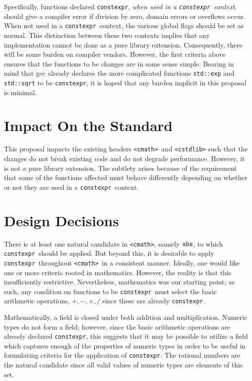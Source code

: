 \documentclass[prd,preprint,amsmath,amssymb,nofootinbib,eqsecnum]{revtex4-1}
\newcommand{\code}[1]{{\tt #1}}
\newcommand{\constexpr}{\code{constexpr}}
\newcommand{\header}[1]{{\tt <#1>}}
\newcommand{\cmath}{\header{cmath}}
\begin{document}
Specifically, functions declared \constexpr, \emph{when used in a \constexpr\ context}, should give a compiler error if division by zero, domain errors or overflows occur. When not used in a \constexpr\ context, the various global flags should be set as normal. This distinction between these two contexts implies that any implementation cannot be done as a pure library extension. Consequently, there will be some burden on compiler vendors. However, the first criteria above ensures that the functions to be changes are in some sense simple. Bearing in mind that gcc already declares the more complicated functions \code{std::exp} and \code{std::sqrt} to be \constexpr, it is hoped that any burden implicit in this proposal is minimal.

\section{Impact On the Standard}

This proposal impacts the existing headers \cmath\ and \header{cstdlib} such that the changes do not break existing code and do not degrade performance. However, it is not a pure library extension. The subtlety arises because of the requirement that some of the functions affected must behave differently depending on whether or not they are used in a \constexpr\ context.

\section{Design Decisions}

There is at least one natural candidate in \header{cmath}, namely $\code{abs}$, to which \constexpr\ should be applied. But beyond this, it is desirable to apply \constexpr\ throughout \cmath\ in a consistent manner. Ideally, one would like one or more criteria rooted in mathematics. However, the reality is that this insufficiently restrictive. Nevertheless, mathematics was our starting point; as such, any condition on functions to be \constexpr\ must select the basic arithmetic operations, $+,-,\times,/$ since these are already \constexpr.

Mathematically, a field is closed under both addition and multiplication. Numeric types do not form a field; however, since the basic arithmetic operations are already declared \constexpr, this suggests that it may be possible to utilize a field which captures enough of the properties of numeric types in order to be useful in formulating criteria for the application of \constexpr. The rational numbers are the natural candidate since all valid values of numeric types are elements of this set. 
\end{document}
